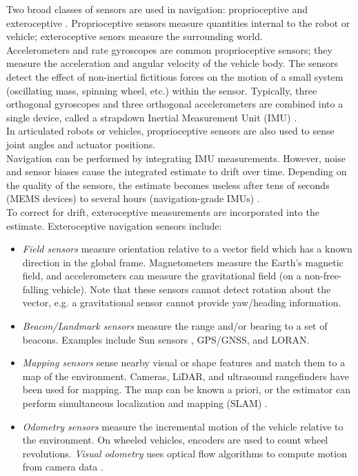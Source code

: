 \documentclass[conference]{IEEEtran}
\begin{document}
Two broad classes of sensors are used in navigation: proprioceptive and exteroceptive \cite{Trawny05quat,Kelly-2010-711}. Proprioceptive sensors measure quantities internal to the robot or vehicle; exteroceptive senors measure the surrounding world.\\

Accelerometers and rate gyroscopes are common proprioceptive sensors; they measure the acceleration and angular velocity of the vehicle body. The sensors detect the effect of non-inertial fictitious forces on the motion of a small system (oscillating mass, spinning wheel, etc.) within the sensor. Typically, three orthogonal gyroscopes and three orthogonal accelerometers are combined into a single device, called a strapdown Inertial Measurement Unit (IMU) \cite{UCAM-CL-TR-696}.\\

In articulated robots or vehicles, proprioceptive sensors are also used to sense joint angles and actuator positions.\\

Navigation can be performed by integrating IMU measurements. However, noise and sensor biases cause the integrated estimate to drift over time. Depending on the quality of the sensors, the estimate becomes useless after tens of seconds (MEMS devices) to several hours (navigation-grade IMUs) \cite{UCAM-CL-TR-696}.\\

To correct for drift, exteroceptive measurements are incorporated into the estimate. Exteroceptive navigation sensors include:
\begin{itemize}
  \item \emph{Field sensors} measure orientation relative to a vector field which has a known direction in the global frame. Magnetometers measure the Earth's magnetic field, and accelerometers can measure the gravitational field (on a non-free-falling vehicle). Note that these sensors cannot detect rotation about the vector, e.g. a gravitational sensor cannot provide yaw/heading information.

  \item \emph{Beacon/Landmark sensors} measure the range and/or bearing to a set of beacons. Examples include Sun sensors \cite{sun-sense}, GPS/GNSS, and LORAN.

  \item \emph{Mapping sensors} sense nearby visual or shape features and match them to a map of the environment. Cameras, LiDAR, and ultrasound rangefinders have been used for mapping. The map can be known a priori, or the estimator can perform simultaneous localization and mapping (SLAM) \cite{AHuangISRR11}.

  \item \emph{Odometry sensors} measure the incremental motion of the vehicle relative to the environment. On wheeled vehicles, encoders are used to count wheel revolutions. \emph{Visual odometry} uses optical flow algorithms to compute motion from camera data \cite{Dille_2009_6430}.
\end{itemize}
\end{document}
